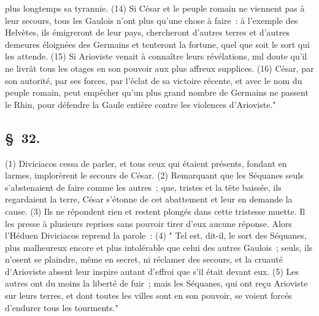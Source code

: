 \documentclass[french,twoside]{book} %
\begin{document}
plus longtemps sa tyrannie. (14) Si César et le peuple romain ne viennent pas à leur secours, tous les Gaulois n’ont plus qu’une chose à faire : à l’exemple des Helvètes, ils émigreront de leur pays, chercheront d’autres terres et d’autres demeures éloignées des Germains et tenteront la fortune, quel que soit le sort qui les attende. (15) Si Arioviste venait à connaître leurs révélations, nul doute qu’il ne livrât tous les otages en son pouvoir aux plus affreux supplices. (16) César, par son autorité, par ses forces, par l’éclat de sa victoire récente, et avec le nom du peuple romain, peut empêcher qu’un plus grand nombre de Germains ne passent le Rhin, pour défendre la Gaule entière contre les violences d’Arioviste."
\subsection[{§ 32.}]{ \textsc{§ 32.} }
\noindent (1) Diviciacos cessa de parler, et tous ceux qui étaient présents, fondant en larmes, implorèrent le secours de César. (2) Remarquant que les Séquanes seuls s’abstenaient de faire comme les autres ; que, tristes et la tête baissée, ils regardaient la terre, César s’étonne de cet abattement et leur en demande la cause. (3) Ils ne répondent rien et restent plongés dans cette tristesse muette. Il les presse à plusieurs reprises sans pouvoir tirer d’eux aucune réponse. Alors l’Héduen Diviciacos reprend la parole : (4) " Tel est, dit-il, le sort des Séquanes, plus malheureux encore et plus intolérable que celui des autres Gaulois ; seuls, ils n’osent se plaindre, même en secret, ni réclamer des secours, et la cruauté d’Arioviste absent leur inspire autant d’effroi que s’il était devant eux. (5) Les autres ont du moins la liberté de fuir ; mais les Séquanes, qui ont reçu Arioviste sur leurs terres, et dont toutes les villes sont en son pouvoir, se voient forcés d’endurer tous les tourments."
\end{document}
